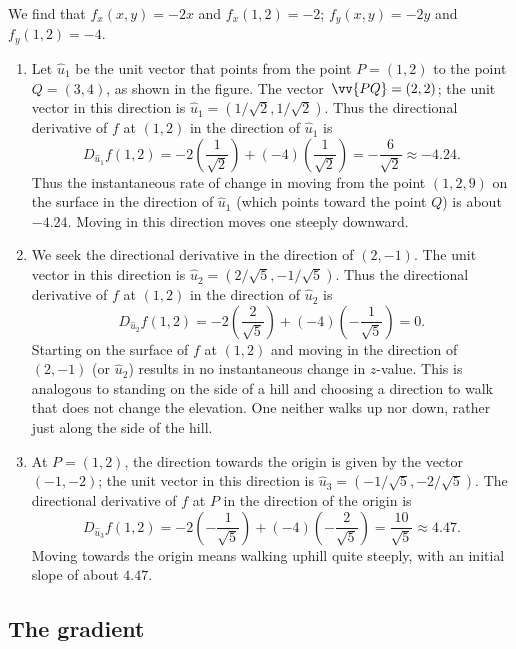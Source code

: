 \begin{example}
We find that $f_x(x,y) = -2x$ and $f_x(1,2) = -2$; $f_y(x,y) = -2y$ and $f_y(1,2) = -4$. 
\begin{enumerate}
	\item Let $\hat u_1$ be the unit vector that points from the point $P=(1,2)$ to the point $Q=(3,4)$, as shown in the figure. The vector $\vv{PQ} = \left( 2,2\right)$; the unit vector in this direction is $\hat u_1=\left( 1/\sqrt{2}, 1/\sqrt{2}\right)$. Thus the directional derivative of $f$ at $(1,2)$ in the direction of $\hat u_1$ is
	$$D_{\hat u_1}f(1,2) = -2\left(\dfrac{1}{\sqrt{2}}\right) +(-4)\left(\dfrac{1}{\sqrt{2}}\right) = -\dfrac{6}{\sqrt{2}}\approx -4.24.$$
	Thus the instantaneous rate of change in moving from the point $(1,2,9)$ on the surface in the direction of $\hat u_1$ (which points toward the point $Q$) is about $-4.24$. Moving in this direction moves one steeply downward.
	
	\item		We seek the directional derivative in the direction of $\left( 2,-1\right)$. The unit vector in this direction is $\hat u_2 = \left( 2/\sqrt{5},-1/\sqrt{5}\right)$. Thus the directional derivative of $f$ at $(1,2)$ in the direction of $\hat u_2$ is
	$$D_{\hat u_2}f(1,2) = -2\left(\dfrac{2}{\sqrt{5}}\right)+(-4)\left(-\dfrac{1}{\sqrt{5}}\right) = 0.$$
	Starting on the surface of $f$ at $(1,2)$ and moving in the direction of $\left( 2,-1\right)$ (or $\hat u_2$) results in no instantaneous change in $z$-value. This is analogous to standing on the side of a hill and choosing a direction to walk that does not change the elevation. One neither walks up nor down, rather just along the side of the hill.
	
	
	\item		At $P=(1,2)$, the direction towards the origin is given by the vector $\left( -1,-2\right)$; the unit vector in this direction is $\hat u_3=\left( -1/\sqrt{5},-2/\sqrt{5}\right)$. The directional derivative of $f$ at $P$ in the direction of the origin is
	$$D_{\hat u_3}f(1,2) = -2\left(-\dfrac{1}{\sqrt{5}}\right) + (-4)\left(-\dfrac{2}{\sqrt{5}}\right) = \dfrac{10}{\sqrt{5}} \approx 4.47.$$
	Moving towards the origin means walking uphill quite steeply, with an initial slope of about $4.47$.
\end{enumerate}
\ifcalculus\vspace{-1cm}\fi
\end{example}

\subsection{The gradient}
	\checkoddpage
{}

